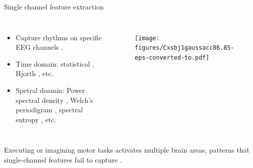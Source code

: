 \documentclass[aspectratio=169]{beamer}
\let\oldcite\cite %
\renewcommand{\cite}[1]{{\tiny\oldcite{#1}}}
\begin{document}
\begin{frame}{Single channel feature extraction}
    \begin{columns}
            \begin{itemize}
                \item Capture rhythms on specific EEG channels \cite{samuel2017towards}.
                \item Time domain: statistical \cite{hamedi2014neural}, Hjorth \cite{yilmaz2018quasi}, etc.
                \item Spetral doamin: Power spectral density \cite{oikonomou2017comparison}, Welch's periodigram \cite{roy2022comparative}, spectral entropy \cite{sarraf2017eeg}, etc.
            \end{itemize}
            \begin{figure}[!ht]
                \centering
                \texttt{[image: figures/Cxsbj1gaussacc86.85-eps-converted-to.pdf]}
            \end{figure}
    \end{columns}
    \vspace{3em}
    \centering
    Executing or imagining motor tasks activates multiple brain areas, patterns that single-channel features fail to capture \cite{chiarion2023connectivity}.
\end{frame}
\end{document}
